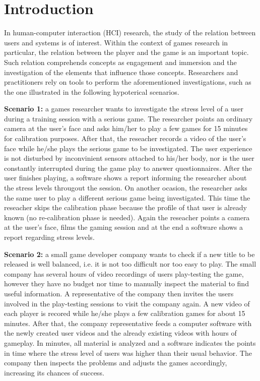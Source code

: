 \chapter{Introduction}
\label{c:introduction}

In human-computer interaction (HCI) research, the study of the relation between users and systems is of interest. Within the context of games research in particular, the relation between the player and the game is an important topic. Such relation comprehends concepts as engagement and immersion \parencite{boyle2012engagement} and the investigation of the elements that influence those concepts. Researchers and practitioners rely on tools to perform the aforementioned investigations, such as the one illustrated in the following hypoterical scenarios.

\textbf{Scenario 1:} a games researcher wants to investigate the stress level of a user during a training session with a serious game. The researcher points an ordinary camera at the user's face and asks him/her to play a few games for 15 minutes for calibration purposes. After that, the reseacher records a video of the user's face while he/she plays the serious game to be investigated. The user experience is not disturbed by inconvinient sensors attached to his/her body, nor is the user constantly interrupted during the game play to answer questionnaires. After the user finishes playing, a software shows a report informing the researcher about the stress levels througout the session. On another ocasion, the researcher asks the same user to play a different serious game being investigated. This time the reseacher skips the calibration phase because the profile of that user is already known (no re-calibration phase is needed). Again the reseacher points a camera at the user's face, films the gaming session and at the end a software shows a report regarding stress levels.

\textbf{Scenario 2:} a small game developer company wants to check if a new title to be released is well balanced, i.e. it is not too difficult nor too easy to play. The small company has several hours of video recordings of users play-testing the game, however they have no budget nor time to manually inspect the material to find useful information. A representative of the company then invites the users involved in the play-testing sessions to visit the company again. A new video of each player is recored while he/she plays a few calibration games for about 15 minutes. After that, the company representative feeds a computer software with the newly created user videos and the already existing videos with hours of gameplay. In minutes, all material is analyzed and a software indicates the points in time where the stress level of users was higher than their usual behavior. The company then inspects the problems and adjusts the games accordingly, increasing its chances of success.

